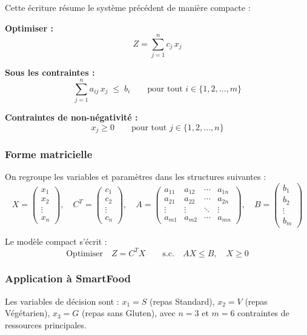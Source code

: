\documentclass[12pt,a4paper]{article}
\begin{document}
Cette écriture résume le système précédent de manière compacte :

\noindent\textbf{Optimiser :}
\[
Z = \sum_{j=1}^{n} c_j\, x_j
\]

\noindent\textbf{Sous les contraintes :}
\[
\sum_{j=1}^{n} a_{ij}\, x_j \;\leq\; b_i \qquad
\text{pour tout } i \in \{1, 2, \ldots, m\}
\]

\noindent\textbf{Contraintes de non-négativité :}
\[
x_j \geq 0 \qquad \text{pour tout } j \in \{1, 2, \ldots, n\}
\]

\subsubsection{Forme matricielle}

On regroupe les variables et paramètres dans les structures suivantes :
\[
X = \begin{pmatrix} x_1 \\ x_2 \\ \vdots \\ x_n \end{pmatrix}, \quad
C^T = \begin{pmatrix} c_1 \\ c_2 \\ \vdots \\ c_n \end{pmatrix}, \quad
A = \begin{pmatrix}
a_{11} & a_{12} & \cdots & a_{1n} \\
a_{21} & a_{22} & \cdots & a_{2n} \\
\vdots & \vdots & \ddots & \vdots \\
a_{m1} & a_{m2} & \cdots & a_{mn}
\end{pmatrix}, \quad
B = \begin{pmatrix} b_1 \\ b_2 \\ \vdots \\ b_m \end{pmatrix}
\]

\noindent Le modèle compact s'écrit :
\[
\text{Optimiser}\quad Z = C^T X
\qquad
\text{s.c.}\quad AX \leq B, \quad X \geq 0
\]

\subsubsection{Application à SmartFood}

Les variables de décision sont : $x_1 = S$ (repas Standard),
$x_2 = V$ (repas Végétarien), $x_3 = G$ (repas sans Gluten), avec $n = 3$ et
$m = 6$ contraintes de ressources principales.
\end{document}
